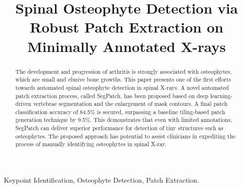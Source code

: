 \documentclass{article}
\title{Spinal Osteophyte Detection via Robust Patch Extraction on Minimally Annotated X-rays}
\begin{document}
%
\maketitle



\begin{abstract}
The development and progression of arthritis is strongly associated with osteophytes, which are small and  elusive bone growths. This paper presents one of the first efforts towards automated spinal osteophyte detection in spinal X-rays.
A novel automated patch extraction process, called SegPatch, has been proposed based on deep learning-driven vertebrae segmentation and the enlargement of mask contours. 
A final patch classification accuracy of 84.5\% is secured, surpassing a baseline tiling-based patch generation technique by 9.5\%. 
This demonstrates that even with limited annotations, SegPatch can deliver superior performance for detection of tiny structures such as osteophytes.
The proposed approach has potential to assist clinicians in expediting the process of manually identifying osteophytes in spinal X-ray.
\end{abstract}
%
\begin{keywords}
Keypoint Identification, Osteophyte Detection, Patch Extraction.
\end{keywords}
%
\end{document}
